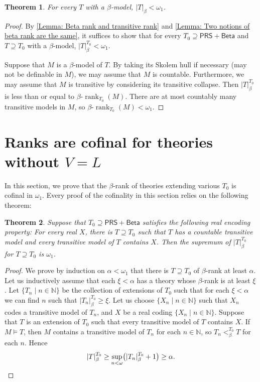\documentclass{amsart}
\newtheorem{theorem}{Theorem}[section]
\theoremstyle{remark}
\newcommand{\bbN}{\mathbb{N}}
\newcommand{\PRS}{\mathsf{PRS}}
\newcommand{\Beta}{\mathsf{Beta}}
\newcommand{\betarank}{\beta\text{-}\operatorname{rank}}
\begin{document}
\begin{theorem}
For every $T$ with a $\beta$-model, $|T|_\beta < \omega_1$.
\end{theorem}
\begin{proof}
By \autoref{Lemma: Beta rank and transitive rank} and \autoref{Lemma: Two notions of beta rank are the same}, it suffices to show that for every $T_0\supseteq \PRS+\Beta$ and $T\supseteq T_0$ with a $\beta$-model, $|T|_{\beta}^{T_0} <\omega_1$.

Suppose that $M$ is a $\beta$-model of $T$. By taking its Skolem hull if necessary (may not be definable in $M$), we may assume that $M$ is countable. Furthermore, we may assume that $M$ is transitive by considering its transitive collapse. Then $|T|_{\beta}^{T_0}$ is less than or equal to $\betarank_{T_0}(M)$. There are at most countably many transitive models in $M$, so $\betarank_{T_0}(M)<\omega_1$.
\end{proof}

\section{Ranks are cofinal for theories without \texorpdfstring{$V=L$}{V=L}}


In this section, we prove that the $\beta$-rank of theories extending various $T_0$ is cofinal in $\omega_1$. Every proof of the cofinality in this section relies on the following theorem:
\begin{theorem} \label{Theorem: Focal theorem for cofinality of beta rank}
    Suppose that $T_0 \supseteq \PRS + \mathsf{Beta}$ satisfies the following \emph{real encoding property}: For every real $X$, there is $T\supseteq T_0$ such that $T$ has a countable transitive model and every transitive model of $T$ contains $X$.
    Then the supremum of $|T|_{\beta}^{T_0}$ for $T\supseteq T_0$ is $\omega_1$.
\end{theorem}
\begin{proof}
    We prove by induction on $\alpha<\omega_1$ that there is $T\supseteq T_0$ of $\beta$-rank at least $\alpha$. Let us inductively assume that each $\xi<\alpha$ has a theory whose $\beta$-rank is at least $\xi$. Let $\{T_n\mid n\in\bbN\}$ be the collection of extensions of $T_0$ such that for each $\xi<\alpha$ we can find $n$ such that $|T_n|_{\beta}^{T_0}\ge\xi$.
    Let us choose $\{X_n\mid n\in \bbN\}$ such that $X_n$ codes a transitive model of $T_n$, and $X$ be a real coding $\{X_n\mid n\in\bbN\}$.
    Suppose that $T$ is an extension of $T_0$ such that every transitive model of $T$ contains $X$. If $M\vDash T$, then $M$ contains a transitive model of $T_n$ for each $n\in\bbN$, so $T_n <^{T_0}_{\beta} T$ for each $n$. Hence
    \begin{equation*}
        |T|_{\beta}^{T_0} \ge \sup_{n<\omega} \bigl(|T_n|_{\beta}^{T_0}+1\bigr) \ge \alpha. \qedhere 
    \end{equation*}
\end{proof}
\end{document}
